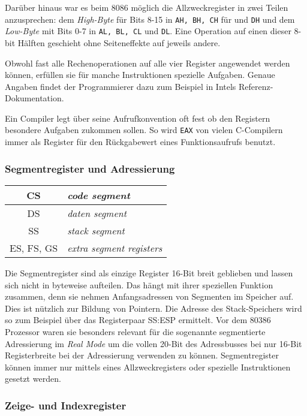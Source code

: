 Darüber hinaus war es beim 8086 möglich die Allzweckregister in zwei Teilen anzusprechen: dem \emph{High-Byte} für Bits 8-15 in {\tt AH, BH, CH} für  und {\tt DH} und dem \emph{Low-Byte} mit Bits 0-7 in {\tt AL, BL, CL} und {\tt DL}. Eine Operation auf einen dieser 8-bit Hälften geschieht ohne Seiteneffekte auf jeweils andere.

Obwohl fast alle Rechenoperationen auf alle vier Register angewendet werden können, erfüllen sie für manche Instruktionen spezielle Aufgaben. Genaue Angaben findet der Programmierer dazu zum Beispiel in Intels Referenz-Dokumentation. \cite{intelreferenz}

Ein Compiler legt über seine Aufrufkonvention oft fest ob den Registern besondere Aufgaben zukommen sollen. So wird {\tt EAX} von vielen C-Compilern immer als Register für den Rückgabewert eines Funktionsaufrufs benutzt. \cite{wp:callconv}

\subsubsection{Segmentregister und Adressierung}

\begin{tabular}{|c|l|}
\hline CS & \emph{code segment} \\
\hline DS & \emph{daten segment} \\
\hline SS & \emph{stack segment} \\
\hline ES, FS, GS & \emph {extra segment registers} \\
\hline
\end{tabular}

Die Segmentregister sind als einzige Register 16-Bit breit geblieben und lassen sich nicht in byteweise aufteilen. Das hängt mit ihrer speziellen Funktion zusammen, denn sie nehmen Anfangsadressen von Segmenten im Speicher auf. Dies ist nützlich zur Bildung von Pointern. Die Adresse des Stack-Speichers wird so zum Beispiel über das Registerpaar SS:ESP ermittelt. Vor dem 80386 Prozessor waren sie besonders relevant für die sogenannte segmentierte Adressierung im \emph{Real Mode} um die vollen 20-Bit des Adressbusses bei nur 16-Bit Registerbreite bei der Adressierung verwenden zu können.
Segmentregister können immer nur mittels eines Allzweckregisters oder spezielle Instruktionen gesetzt werden.


\subsubsection{Zeige- und Indexregister}


